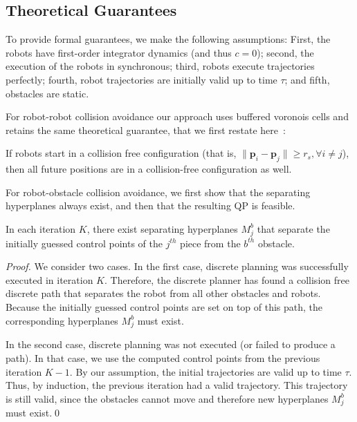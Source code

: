 \documentclass{svproc}
\newcommand{\vp}{\mathbf{p}}
\begin{document}

\subsection{Theoretical Guarantees} %
To provide formal guarantees, we make the following assumptions:
First, the robots have first-order integrator dynamics (and thus $c=0$);
second, the execution of the robots in synchronous;
third, robots execute trajectories perfectly;
fourth, robot trajectories are initially valid up to time $\tau$; and
fifth, obstacles are static.

For robot-robot collision avoidance our approach uses buffered voronois cells and retains the same theoretical guarantee, that we first restate here~\cite{bufferedVoronoiCells}:
\begin{lemma}
If robots start in a collision free configuration (that is, $\|\vp_i - \vp_j\| \geq r_s, \forall i\neq j$), then all future positions are in a collision-free configuration as well.
\end{lemma}

For robot-obstacle collision avoidance, we first show that the separating hyperplanes always exist, and then that the resulting QP is feasible.

\begin{lemma}
\label{lemma:hyperplanes}
In each iteration $K$, there exist separating hyperplanes $M_j^b$ that separate the initially guessed control points of the $j^{th}$ piece from the $b^{th}$ obstacle.
\end{lemma}
\begin{proof}
We consider two cases.
In the first case, discrete planning was successfully executed in iteration $K$.
Therefore, the discrete planner has found a collision free discrete path that separates the robot from all other obstacles and robots. 
Because the initially guessed control points are set on top of this path, the corresponding hyperplanes $M_j^b$ must exist.

In the second case, discrete planning was not executed (or failed to produce a path).
In that case, we use the computed control points from the previous iteration $K-1$.
By our assumption, the initial trajectories are valid up to time $\tau$.
Thus, by induction, the previous iteration had a valid trajectory. This trajectory is still valid, since the obstacles cannot move and therefore new hyperplanes $M_j^b$ must exist.\qed
\end{proof}
\end{document}
